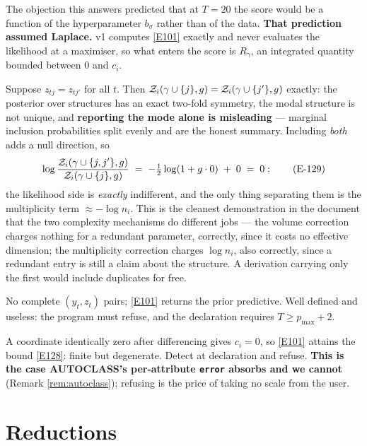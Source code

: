 \begin{description}[style=nextline, leftmargin=2em, topsep=0pt]
  The objection this answers predicted that at $T=20$ the score would be a function
  of the hyperparameter $b_\sigma$ rather than of the data. \textbf{That prediction
  assumed Laplace.} v1 computes \eqref{E101} exactly and never evaluates the
  likelihood at a maximiser, so what enters the score is $R_\gamma$, an integrated
  quantity bounded between 0 and $c_i$.

\item[(D-d) Duplicate or collinear regressors.]
  Suppose $z_{tj}=z_{tj'}$ for all $t$. Then
  $\mathcal{Z}_i(\gamma\cup\{j\},g)=\mathcal{Z}_i(\gamma\cup\{j'\},g)$ exactly: the posterior over
  structures has an exact two-fold symmetry, the modal structure is not unique, and
  \textbf{reporting the mode alone is misleading} --- marginal inclusion
  probabilities split evenly and are the honest summary. Including \emph{both} adds a
  null direction, so
\begin{equation}
\log\frac{\mathcal{Z}_i(\gamma\cup\{j,j'\},g)}{\mathcal{Z}_i(\gamma\cup\{j\},g)} \;=\;
-\tfrac12\log(1+g\cdot0) \;+\; 0 \;=\; 0:
\tag{E-129}\label{E129}
\end{equation}
  the likelihood side is \emph{exactly} indifferent, and the only thing separating
  them is the multiplicity term $\approx-\log n_i$. This is the cleanest
  demonstration in the document that the two complexity mechanisms do different jobs
  --- the volume correction charges nothing for a redundant parameter, correctly,
  since it costs no effective dimension; the multiplicity correction charges
  $\log n_i$, also correctly, since a redundant entry is still a claim about the
  structure. A derivation carrying only the first would include duplicates for free.

\item[(D-e) $T\le p_{\max}$.]
  No complete $(y_t,z_t)$ pairs; \eqref{E101} returns the prior predictive. Well
  defined and useless: the program must refuse, and the declaration requires
  $T\ge p_{\max}+2$.

\item[(D-f) A constant coordinate.]
  A coordinate identically zero after differencing gives $c_i=0$, so \eqref{E101}
  attains the bound \eqref{E128}: finite but degenerate. Detect at declaration and
  refuse. \textbf{This is the case AUTOCLASS's per-attribute \texttt{error} absorbs
  and we cannot} (Remark \ref{rem:autoclass}); refusing is the price of taking no
  scale from the user.
\end{description}


\section{Reductions}\label{sec:red}

